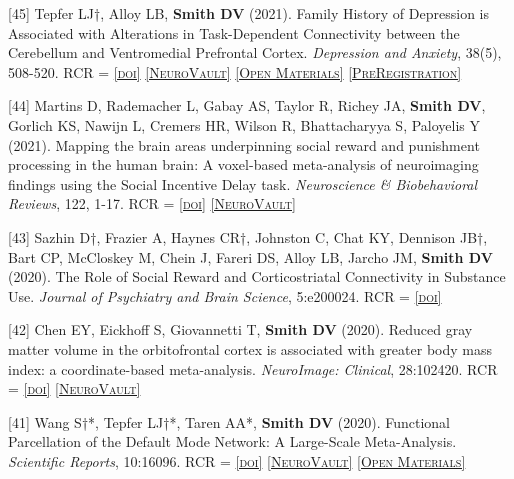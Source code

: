 \documentclass[11pt, letterpaper]{article}
\newcommand{\doi}[1]{\href{#1}{\scriptsize\textsc{[doi]}}} %
\newcommand{\neurovault}[1]{\href{#1}{\scriptsize\textsc{[NeuroVault]}}}
\newcommand{\materials}[1]{\href{#1}{\scriptsize\textsc{[Open Materials]}}}
\newcommand{\preregistration}[1]{\href{#1}{\scriptsize\textsc{[PreRegistration]}}}
\begin{document}
\begin{hangparas}{.5in}{1}

[45] Tepfer LJ†, Alloy LB, \textbf{Smith DV} (2021). Family History of Depression is Associated with Alterations in Task-Dependent Connectivity between the Cerebellum and Ventromedial Prefrontal Cortex. \textit{Depression and Anxiety},  38(5), 508-520. RCR =  \doi{https://doi.org/10.1002/da.23143} \neurovault{https://neurovault.org/collections/6130/} \materials{https://osf.io/ju32v/} \preregistration{http://aspredicted.org/blind.php?x=8qw2h3}

[44] Martins D, Rademacher L, Gabay AS, Taylor R, Richey JA, \textbf{Smith DV}, Gorlich KS, Nawijn L, Cremers HR, Wilson R, Bhattacharyya S, Paloyelis Y (2021). Mapping the brain areas underpinning social reward and punishment processing in the human brain: A voxel-based meta-analysis of neuroimaging findings using the Social Incentive Delay task. \textit{Neuroscience \& Biobehavioral Reviews}, 122, 1-17. RCR =  \doi{https://doi.org/10.1016/j.neubiorev.2020.12.034} \neurovault{https://neurovault.org/collections/7793}

[43] Sazhin D†, Frazier A, Haynes CR†, Johnston C, Chat KY, Dennison JB†, Bart CP, McCloskey M, Chein J, Fareri DS, Alloy LB, Jarcho JM, \textbf{Smith DV} (2020). The Role of Social Reward and Corticostriatal Connectivity in Substance Use. \textit{Journal of Psychiatry and Brain Science}, 5:e200024. RCR =  \doi{https://doi.org/10.20900/jpbs.20200024} %

[42] Chen EY, Eickhoff S, Giovannetti T, \textbf{Smith DV} (2020). Reduced gray matter volume in the orbitofrontal cortex is associated with greater body mass index: a coordinate-based meta-analysis. \textit{NeuroImage: Clinical}, 28:102420. RCR =  \doi{https://doi.org/10.1016/j.nicl.2020.102420} \neurovault{https://neurovault.org/collections/8703/} 

[41] Wang S†*, Tepfer LJ†*, Taren AA*, \textbf{Smith DV} (2020). Functional Parcellation of the Default Mode Network: A Large-Scale Meta-Analysis. \textit{Scientific Reports}, 10:16096. RCR =  \doi{https://doi.org/10.1038/s41598-020-72317-8} \neurovault{https://identifiers.org/neurovault.collection:6262} \materials{https://zenodo.org/record/3599989\#.Xl2u4y2ZPOQ} 


\end{hangparas}
\end{document}
